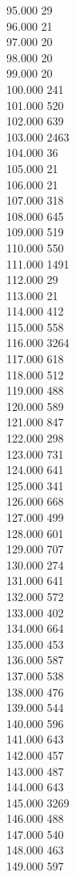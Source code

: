 { 95.000	29 \\
 96.000	21 \\
 97.000	20 \\
 98.000	20 \\
 99.000	20 \\
 100.000	241 \\
 101.000	520 \\
 102.000	639 \\
 103.000	2463 \\
 104.000	36 \\
 105.000	21 \\
 106.000	21 \\
 107.000	318 \\
 108.000	645 \\
 109.000	519 \\
 110.000	550 \\
 111.000	1491 \\
 112.000	29 \\
 113.000	21 \\
 114.000	412 \\
 115.000	558 \\
 116.000	3264 \\
 117.000	618 \\
 118.000	512 \\
 119.000	488 \\
 120.000	589 \\
 121.000	847 \\
 122.000	298 \\
 123.000	731 \\
 124.000	641 \\
 125.000	341 \\
 126.000	668 \\
 127.000	499 \\
 128.000	601 \\
 129.000	707 \\
 130.000	274 \\
 131.000	641 \\
 132.000	572 \\
 133.000	402 \\
 134.000	664 \\
 135.000	453 \\
 136.000	587 \\
 137.000	538 \\
 138.000	476 \\
 139.000	544 \\
 140.000	596 \\
 141.000	643 \\
 142.000	457 \\
 143.000	487 \\
 144.000	643 \\
 145.000	3269 \\
 146.000	488 \\
 147.000	540 \\
 148.000	463 \\
 149.000	597 \\
}
